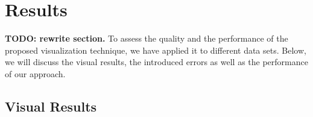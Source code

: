 \documentclass[review,journal]{vgtc}         %
\begin{document}
\section{Results}\label{sec:results}

\textbf{TODO: rewrite section.} To assess the quality and the performance of the proposed visualization technique, we have applied it to different data sets. Below, we will discuss the visual results, the introduced errors as well as the performance of our approach.

\subsection{Visual Results}

\begin{figure}[t]
    \centering
    \\
\end{figure}
\end{document}
